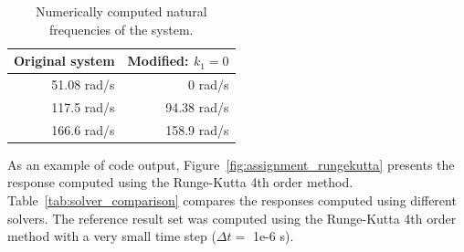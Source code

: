 \documentclass{article}
\begin{document}
	\begin{table}[h!]
		\centering
		\begin{tabular}{|r|r|}
			\hline
			Original system & Modified: $k_1 = 0$ \\
			\hline
			51.08 rad/s & 0 rad/s \\
			117.5 rad/s & 94.38 rad/s \\
			166.6 rad/s & 158.9 rad/s \\
			\hline
		\end{tabular}
		\caption{Numerically computed natural frequencies of the system.}
		\label{tab:natural_frequencies}
	\end{table}

	\clearpage
	As an example of code output, Figure~\ref*{fig:assignment_rungekutta} presents the response computed using the Runge-Kutta 4th order method. Table~\ref*{tab:solver_comparison} compares the responses computed using different solvers. The reference result set was computed using the Runge-Kutta 4th order method with a very small time step ($\Delta t = $ 1e-6 s).
\end{document}
